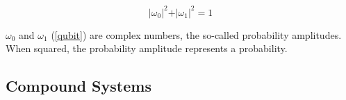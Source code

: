 \begin{equation}
\label{2nd_axyom}
\vert\omega_{0}\vert^{2}+\vert\omega_{1}\vert^{2}=1
\end{equation}

 
$\omega_{0}$ and $\omega_{1}$ (\ref{qubit}) are complex numbers, the so-called probability amplitudes. When squared, the probability amplitude represents a probability. 

\begin{comment}
We can define linear operators in the Hilbert space, one of the most important classes of operators being the self-adjoint operators,  $A = A^{*}$, that have the property stated in \ref{eq_adjoint}. The Hermitian operator is one that satisfies the property of being equal to its conjugate transposed, $A = A^{*T} =A^\dagger$ .  In a finite-dimensional Hilbert space defined by a set of orthonormal basis every self-adjoint operator is Hermitian.

\begin{equation}
\label{eq_adjoint}
\langle A^{*}z\vert x\rangle=\langle z\vert Ax\rangle
\end{equation}

Observables are deemed as the physical properties that can be measured. One way to think of them is to consider the 20 question game, where a two player game where one person thinks of an object and then the second person has a set of 20 "Yes" or "No" to discover the object, one observable could be "Is it red?". With each question the space comprising the possible answers will not increase, this means that asking two times in a row if the object is red in the game will always yield the same answer.
 
Hermitian operators are suitable for being used as observables, as their eigenvalues are real numbers.
The eigenvectors associated with the eigenvalues of the observable will correspond to the state in which the system will be after applying the Hermitian operator. Thus applying an observable to the system can be viewed as doing a projection of the system in the basis formed by the eigenvectors.  
\end{comment}

\subsection{Compound Systems}
\label{subsec:compound_systems}

